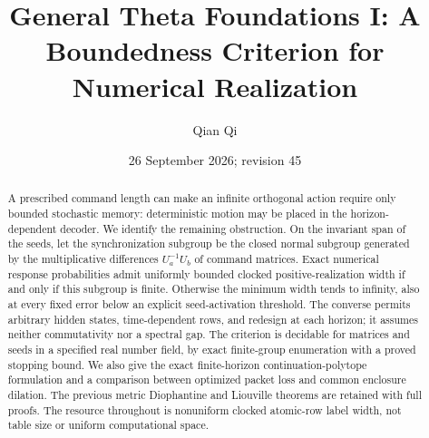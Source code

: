 \documentclass[11pt]{amsart}
\title[Synchronized actions and numerical realization]{General Theta Foundations I: A Boundedness Criterion for Numerical Realization}
\author{Qian Qi}
\date{26 September 2026; revision 45}
\numberwithin{equation}{section}
\theoremstyle{definition}\newtheorem{definition}[theorem]{Definition}
\begin{document}
\begin{abstract}
A prescribed command length can make an infinite orthogonal action require only bounded stochastic memory: deterministic motion may be placed in the horizon-dependent decoder. We identify the remaining obstruction. On the invariant span of the seeds, let the synchronization subgroup be the closed normal subgroup generated by the multiplicative differences $U_a^{-1}U_b$ of command matrices. Exact numerical response probabilities admit uniformly bounded clocked positive-realization width if and only if this subgroup is finite. Otherwise the minimum width tends to infinity, also at every fixed error below an explicit seed-activation threshold. The converse permits arbitrary hidden states, time-dependent rows, and redesign at each horizon; it assumes neither commutativity nor a spectral gap. The criterion is decidable for matrices and seeds in a specified real number field, by exact finite-group enumeration with a proved stopping bound. We also give the exact finite-horizon continuation-polytope formulation and a comparison between optimized packet loss and common enclosure dilation. The previous metric Diophantine and Liouville theorems are retained with full proofs. The resource throughout is nonuniform clocked atomic-row label width, not table size or uniform computational space.
\end{abstract}
\maketitle
















\end{document}
